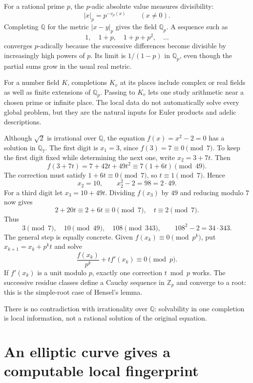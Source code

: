 For a rational prime \(p\), the \(p\)-adic absolute value measures divisibility:
\[
 |x|_p=p^{-v_p(x)}\qquad(x\ne0).
\]
Completing \(\mathbb Q\) for the metric \(|x-y|_p\) gives the field \(\mathbb Q_p\). A sequence such as
\[
 1,\quad 1+p,\quad 1+p+p^2,\quad \ldots
\]
converges \(p\)-adically because the successive differences become divisible by increasingly high powers of \(p\). Its limit is \(1/(1-p)\) in \(\mathbb Q_p\), even though the partial sums grow in the usual real metric.

For a number field \(K\), completions \(K_v\) at its places include complex or real fields as well as finite extensions of \(\mathbb Q_p\). Passing to \(K_v\) lets one study arithmetic near a chosen prime or infinite place. The local data do not automatically solve every global problem, but they are the natural inputs for Euler products and adelic descriptions.

\begin{example}
Although $\sqrt2$ is irrational over $\mathbb Q$, the equation
$f(x)=x^2-2=0$ has a solution in $\mathbb Q_7$. The first digit is
$x_1=3$, since $f(3)=7\equiv0\pmod7$. To keep the first digit fixed while determining the next one, write $x_2=3+7t$. Then
\[
 f(3+7t)=7+42t+49t^2
        \equiv7(1+6t)\pmod{49}.
\]
The correction must satisfy $1+6t\equiv0\pmod7$, so $t\equiv1\pmod7$. Hence
\[
 x_2=10,\qquad x_2^2-2=98=2\cdot49.
\]
For a third digit let $x_3=10+49t$. Dividing $f(x_3)$ by $49$ and reducing modulo $7$ now gives
\[
 2+20t\equiv2+6t\equiv0\pmod7,
 \quad t\equiv2\pmod7.
\]
Thus
\[
 \boxed{3\pmod7,\quad10\pmod{49},\quad108\pmod{343}},
 \qquad 108^2-2=34\cdot343.
\]
The general step is equally concrete. Given $f(x_k)\equiv0\pmod{p^k}$, put
$x_{k+1}=x_k+p^kt$ and solve
\[
 \frac{f(x_k)}{p^k}+t f'(x_k)\equiv0\pmod p.
\]
If $f'(x_k)$ is a unit modulo $p$, exactly one correction $t\bmod p$ works. The successive residue classes define a Cauchy sequence in $\mathbb Z_p$ and converge to a root: this is the simple-root case of Hensel's lemma.

There is no contradiction with irrationality over $\mathbb Q$: solvability in one completion is local information, not a rational solution of the original equation.
\end{example}

\section{An elliptic curve gives a computable local fingerprint}

